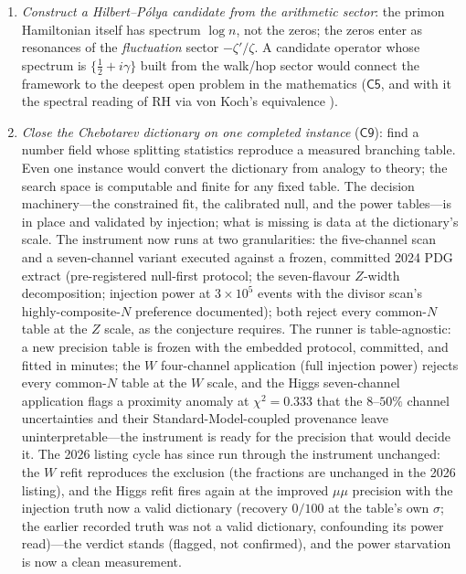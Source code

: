 \begin{enumerate}[leftmargin=1.6em]
experiments and by Dyson--Brownian-motion arguments. The banded-incommensurate claim
is verified numerically at every scale computed: GOE ratio statistics
($\langle r\rangle=0.45$--$0.58$) from $D=625$ to $5.9\times10^{4}$ at generic
coupling, with the weak-coupling limit identifiable by $\mathrm{PR}/D\to10^{-4}$
---though whether the correspondence is GOE or GUE in the infinite limit is exactly
what finite windows cannot decide ($\langle r\rangle$ separates GOE from GUE by
only $0.06$).
\item \emph{Construct a Hilbert--P\'olya candidate from the arithmetic sector}: the
primon Hamiltonian itself has spectrum $\log n$, not the zeros; the zeros enter as
resonances of the \emph{fluctuation} sector $-\zeta'/\zeta$. A candidate operator whose
spectrum is $\{\tfrac12+i\gamma\}$ built from the walk/hop sector would connect the
framework to the deepest open problem in the mathematics ($\mathsf{C5}$, and with it the
spectral reading of RH via von Koch's equivalence \cite{vonkoch1901}).
\item \emph{Close the Chebotarev dictionary on one completed instance} ($\mathsf{C9}$):
find a number field whose splitting statistics reproduce a measured branching table. Even
one instance would convert the dictionary from analogy to theory; the search space is
computable and finite for any fixed table. The decision machinery---the constrained fit,
the calibrated null, and the power tables---is in place and validated by injection; what is
missing is data at the dictionary's scale. The instrument now runs at two granularities:
the five-channel scan and a seven-channel variant executed against a frozen, committed
2024 PDG extract (pre-registered null-first protocol; the seven-flavour $Z$-width
decomposition; injection power at $3\times10^{5}$ events with the divisor scan's
highly-composite-$N$ preference documented); both reject every common-$N$ table at the $Z$
scale, as the conjecture requires. The runner is table-agnostic: a new precision table
is frozen with the embedded protocol, committed, and fitted in minutes; the $W$ four-channel
application (full injection power) rejects every common-$N$ table at the $W$ scale, and the
Higgs seven-channel application flags a proximity anomaly at $\chi^{2}=0.333$ that the
$8$--$50\%$ channel uncertainties and their Standard-Model-coupled provenance leave
uninterpretable---the instrument is ready for the precision that would decide it. The
2026 listing cycle has since run through the instrument unchanged: the $W$ refit
reproduces the exclusion (the fractions are unchanged in the 2026 listing), and the
Higgs refit fires again at the improved $\mu\mu$ precision with the injection truth now
a valid dictionary (recovery $0/100$ at the table's own $\sigma$; the earlier recorded
truth was not a valid dictionary, confounding its power read)---the verdict stands
(flagged, not confirmed), and the power starvation is now a clean measurement.
\end{enumerate}

